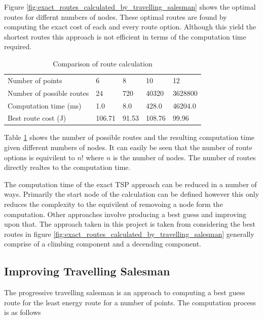 \documentclass[a4paper,12pt,twoside]{article}
\begin{document}
Figure \ref{fig:exact_routes_calculated_by_travelling_salesman} shows the optimal routes for differnt numbers of nodes. These optimal routes are found by computing the exact cost of each and every route option. Although this yield the shortest routes this approach is not efficient in terms of the computation time required.

\begin{table}[width=\textwidth]
\centering
    \begin{tabular}{lllll}
    Number of points	& 6	& 8	& 10	& 12	\\
Number of possible routes	& 24	& 720	& 40320	& 3628800	\\
Computation time (ms)	& 1.0	& 8.0	& 428.0	& 46204.0	\\
Best route cost (J)	& 106.71	& 91.53	& 108.76	& 99.96	\\

    \end{tabular}
\caption{Comparison of route calculation}
\label{tbl:comparison_of_route_calculation}
\end{table}

Table \ref{tbl:comparison_of_route_calculation} shows the number of possible routes and the resulting computation time given different numbers of nodes. It can easily be seen that the number of route options is equivilent to $n!$ where $n$ is the number of nodes. The number of routes directly realtes to the computation time.

The computation time of the exact TSP approach can be reduced in a number of ways. Primarily the start node of the calculation can be defined however this only reduces the complexity to the equivilent of removoing a node form the computation. Other approaches involve producing a best guess and improving upon that. The approach taken in this project is taken from considering the best routes in figure \ref{fig:exact_routes_calculated_by_travelling_salesman} generally comprise of a climbing component and a decending component.

\subsection{Improving Travelling Salesman}
\label{sec:improving_travelling_salesman}

The progressive travelling salesman is an approach to computing a best guess route for the least energy route for a number of points. The computation process is as follows
\end{document}
